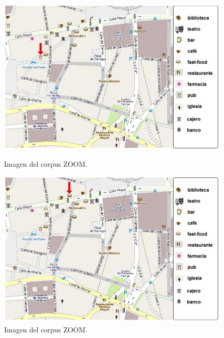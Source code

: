 \begin{figure}
\begin{minipage}[b]{0.5\linewidth}
\centering
\includegraphics[width=\textwidth]{images/corpus/mapa3.png}
\caption{Imagen del corpus ZOOM.}
\label{mapa3}
\end{minipage}
\hspace*{0cm}
\begin{minipage}[b]{0.5\linewidth}
\centering
\includegraphics[width=\textwidth]{images/corpus/mapa4.png}
\caption{Imagen del corpus ZOOM.}
\label{mapa4}
\end{minipage}
\end{figure}

